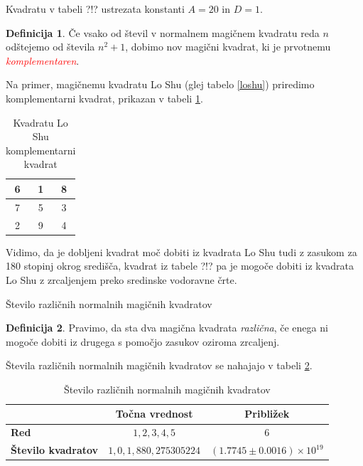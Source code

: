 \documentclass[a4paper,12pt]{article}
\theoremstyle{definition}
\newtheorem{definition}{Definicija}
\begin{document}
Kvadratu v tabeli ?!? ustrezata konstanti $A=20$ in $D=1$.

\begin{definition}
      Če vsako od števil v normalnem magičnem kvadratu reda $n$ odštejemo
      od števila $n^2+1$, dobimo nov magični kvadrat, ki je prvotnemu
      \textcolor{red}{\emph{komplementaren}}.
\end{definition}

Na primer, magičnemu kvadratu Lo Shu (glej tabelo \ref{loshu}) priredimo
komplementarni kvadrat, prikazan v tabeli \ref{closhu}.
%
\begin{table}[h!]
   \centering
   \caption{Kvadratu Lo Shu komplementarni kvadrat}
   \label{closhu}
   \begin{tabular}{|c|c|c|}
      \hline
      6 & 1 & 8 \\\hline
      7 & 5 & 3 \\\hline
      2 & 9 & 4 \\\hline
   \end{tabular}
\end{table}
Vidimo, da je dobljeni kvadrat moč dobiti iz kvadrata Lo Shu tudi z zasukom za
180 stopinj okrog središča, kvadrat iz tabele ?!? pa je mogoče dobiti
iz kvadrata Lo Shu z zrcaljenjem preko sredinske vodoravne črte.

Število različnih normalnih magičnih kvadratov

\begin{definition}
      Pravimo, da sta dva magična kvadrata \emph{različna}, če enega ni mogoče dobiti
      iz drugega s pomočjo zasukov oziroma zrcaljenj.
\end{definition}

Števila različnih normalnih magičnih kvadratov se nahajajo v tabeli \ref{stevila}.

\begin{table}[h!]
    \centering
    \caption{Število različnih normalnih magičnih kvadratov}
    \label{stevila}
    \begin{tabular}{lcc}
        \hline
        \textbf{} & \textbf{Točna vrednost} & \textbf{Približek} \\ \hline
        \textbf{Red} & $1, 2, 3, 4, 5$ & $6$ \\ 
        \textbf{Število kvadratov} & $1, 0, 1, 880, 275305224$ & $(1.7745 \pm 0.0016) \times 10^{19}$ \\ \hline
    \end{tabular}
\end{table}
\end{document}

